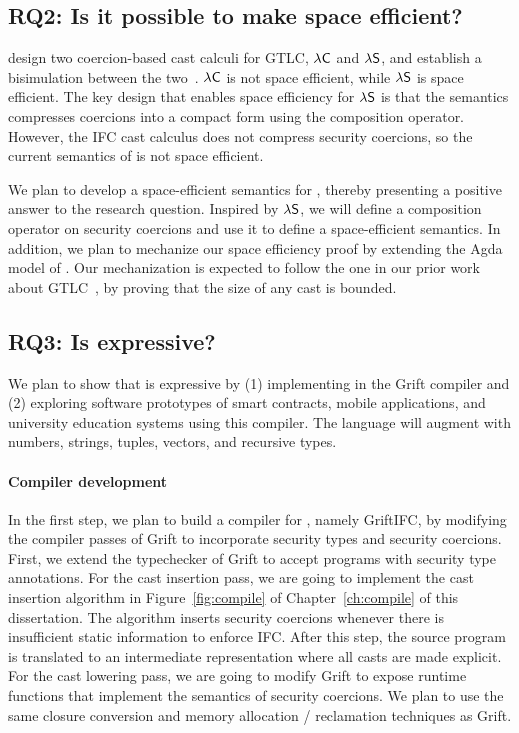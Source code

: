 \subsection{RQ2: Is it possible to make \Surface space efficient?}

\textcite{Siek:2015ab} design two coercion-based cast calculi for GTLC,
$\lambda\textup{\textsf{C}}$ and $\lambda\textup{\textsf{S}}$, and establish a
bisimulation between the two~. $\lambda\textup{\textsf{C}}$ is not space
efficient, while $\lambda\textup{\textsf{S}}$ is space efficient. The key design
that enables space efficiency for $\lambda\textup{\textsf{S}}$ is that the
semantics compresses coercions into a compact form using the composition
operator. However, the IFC cast calculus \CC does not compress security
coercions, so the current semantics of \Surface is not space efficient.

We plan to develop a space-efficient semantics for \Surface, thereby presenting
a positive answer to the research question. Inspired by
$\lambda\textup{\textsf{S}}$, we will define a composition operator on security
coercions and use it to define a space-efficient semantics. In addition, we plan
to mechanize our space efficiency proof by extending the Agda model of \Surface.
Our mechanization is expected to follow the one in our prior work about
GTLC~\parencite{siek_chen_2021}, by proving that the size of any cast is
bounded.

\subsection{RQ3: Is \SurfacePlus expressive?}
\label{sec:case-studies}

We plan to show that \SurfacePlus is expressive by (1) implementing
\SurfacePlus in the Grift compiler and (2) exploring software
prototypes of smart contracts, mobile applications, and university
education systems using this compiler.  The \SurfacePlus language will
augment \Surface with numbers, strings, tuples, vectors, and recursive
types.

\paragraph{Compiler development} In the first step, we plan to build a compiler
for \SurfacePlus, namely GriftIFC, by modifying the compiler passes of Grift to
incorporate security types and security coercions. First, we extend the
typechecker of Grift to accept programs with security type annotations. For the
cast insertion pass, we are going to implement the cast insertion algorithm in
Figure~\ref{fig:compile} of Chapter~\ref{ch:compile} of this dissertation. The
algorithm inserts security coercions whenever there is insufficient static
information to enforce IFC. After this step, the source program is translated to
an intermediate representation where all casts are made explicit. For the cast
lowering pass, we are going to modify Grift to expose runtime functions that
implement the semantics of security coercions. We plan to use the same closure
conversion and memory allocation / reclamation techniques as Grift.

